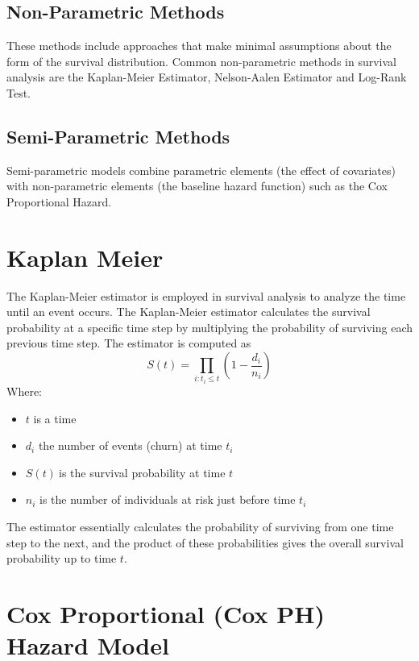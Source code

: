 \documentclass[doublespacing]{report} [12px]%
\begin{document}
\subsection{Non-Parametric Methods}

These methods include approaches that make minimal assumptions about the form of the survival distribution. Common non-parametric methods in survival analysis are the Kaplan-Meier Estimator, Nelson-Aalen Estimator and Log-Rank Test.

\subsection{Semi-Parametric Methods}

Semi-parametric models combine parametric elements (the effect of covariates) with non-parametric elements (the baseline hazard function) such as the Cox Proportional Hazard.

\section{Kaplan Meier}
The Kaplan-Meier estimator is employed in survival analysis to analyze the time until an event occurs. The Kaplan-Meier estimator calculates the survival probability at a specific time step by multiplying the probability of surviving each previous time step.
The estimator is computed as
\begin{equation}
S\left(t\right)=\prod_{i:t_i\le t}\left(1-\frac{d_i}{n_i}\right)
\end{equation}
Where:
 \begin{itemize}
     \item \(t\) is a time
     \item \(d_i \) the number of events (churn) at time \(t_i\)
     \item \(S\left(t\right)\ \)is the survival probability at time \(t\)
     \item \(n_i\) is the number of individuals at risk just before time \(t_i\)
 \end{itemize}
The estimator essentially calculates the probability of surviving from one time step to the next, and the product of these probabilities gives the overall survival probability up to time \(t\).

\section{Cox Proportional (Cox PH) Hazard Model}
\end{document}
